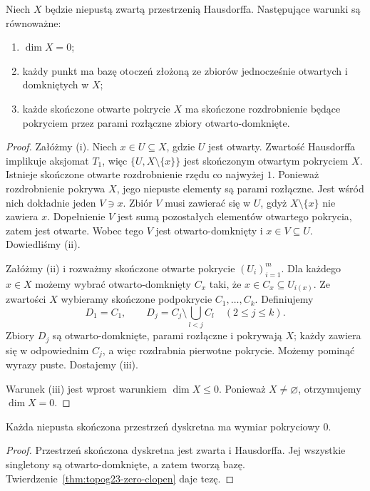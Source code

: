 \begin{twierdzenie}
\label{thm:topog23-zero-clopen}
Niech \(X\) będzie niepustą zwartą przestrzenią Hausdorffa.
Następujące warunki są równoważne:
\begin{enumerate}[label=\textup{(\roman*)}]
\item \(\dim X=0\);
\item każdy punkt ma bazę otoczeń
złożoną ze zbiorów jednocześnie otwartych
i domkniętych w \(X\);
\item każde skończone otwarte pokrycie \(X\)
ma skończone rozdrobnienie będące
pokryciem przez parami rozłączne
zbiory otwarto-domknięte.
\end{enumerate}
\end{twierdzenie}
\begin{proof}
Załóżmy \textup{(i)}.
Niech \(x\in U\subseteq X\), gdzie \(U\) jest otwarty.
Zwartość Hausdorffa implikuje aksjomat \(T_1\),
więc \(\{U,X\setminus\{x\}\}\)
jest skończonym otwartym pokryciem \(X\).
Istnieje skończone otwarte rozdrobnienie
rzędu co najwyżej \(1\).
Ponieważ rozdrobnienie pokrywa \(X\),
jego niepuste elementy są parami rozłączne.
Jest wśród nich dokładnie jeden \(V\ni x\).
Zbiór \(V\) musi zawierać się w \(U\),
gdyż \(X\setminus\{x\}\) nie zawiera \(x\).
Dopełnienie \(V\) jest sumą pozostałych
elementów otwartego pokrycia,
zatem jest otwarte.
Wobec tego \(V\) jest otwarto-domknięty
i \(x\in V\subseteq U\).
Dowiedliśmy \textup{(ii)}.

Załóżmy \textup{(ii)} i rozważmy
skończone otwarte pokrycie \((U_i)_{i=1}^m\).
Dla każdego \(x\in X\) możemy wybrać
otwarto-domknięty \(C_x\) taki, że
\(x\in C_x\subseteq U_{i(x)}\).
Ze zwartości \(X\) wybieramy skończone
podpokrycie \(C_1,\ldots,C_k\).
Definiujemy
\[
 D_1=C_1,\qquad
 D_j=C_j\setminus\bigcup_{l<j}C_l
 \quad (2\le j\le k).
\]
Zbiory \(D_j\) są otwarto-domknięte,
parami rozłączne i pokrywają \(X\);
każdy zawiera się w odpowiednim \(C_j\),
a więc rozdrabnia pierwotne pokrycie.
Możemy pominąć wyrazy puste.
Dostajemy \textup{(iii)}.

Warunek \textup{(iii)} jest wprost
warunkiem \(\dim X\le0\).
Ponieważ \(X\neq\varnothing\),
otrzymujemy \(\dim X=0\).
\end{proof}

\begin{stwierdzenie}
\label{prop:topog23-finite-zero}
Każda niepusta skończona przestrzeń dyskretna
ma wymiar pokryciowy \(0\).
\end{stwierdzenie}
\begin{proof}
Przestrzeń skończona dyskretna jest zwarta
i Hausdorffa. Jej wszystkie singletony
są otwarto-domknięte, a zatem tworzą bazę.
Twierdzenie~\ref{thm:topog23-zero-clopen}
daje tezę.
\end{proof}

